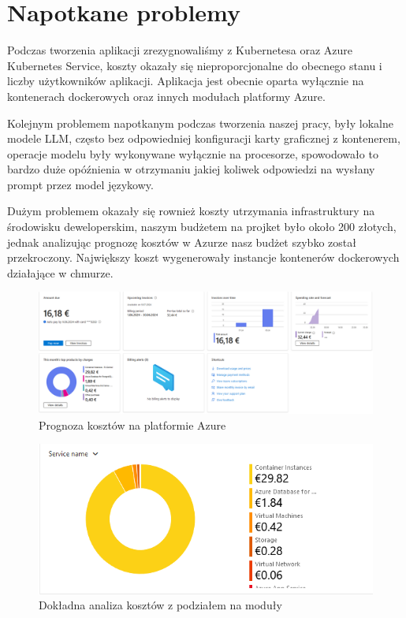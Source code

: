 \section{Napotkane problemy}
Podczas tworzenia aplikacji zrezygnowaliśmy z Kubernetesa oraz Azure Kubernetes Service, koszty okazały się nieproporcjonalne do obecnego stanu i liczby użytkowników aplikacji. Aplikacja jest obecnie oparta wyłącznie na kontenerach dockerowych oraz innych modułach platformy Azure.

Kolejnym problemem napotkanym podczas tworzenia naszej pracy, były lokalne modele LLM, często bez odpowiedniej konfiguracji karty graficznej z kontenerem, operacje modelu były wykonywane wyłącznie na procesorze, spowodowało to bardzo duże opóźnienia w otrzymaniu jakiej koliwek odpowiedzi na wysłany prompt przez model językowy.

Dużym problemem okazały się rownież koszty utrzymania infrastruktury na środowisku deweloperskim, naszym budżetem na projket było około 200 złotych, jednak analizując prognozę kosztów w Azurze nasz budżet szybko został przekroczony. Największy koszt wygenerowały instancje kontenerów dockerowych działające w chmurze. 

\begin{figure}[h]
    \centering
    \includegraphics[width=1\textwidth]{Obrazy/costs.png}
    \caption{Prognoza kosztów na platformie Azure}
    \label{fig:my_label}
\end{figure}

\begin{figure}[h]
    \centering
    \includegraphics[width=1\textwidth]{Obrazy/costs3.png}
    \caption{Dokładna analiza kosztów z podziałem na moduły}
    \label{fig:my_label}
\end{figure}


